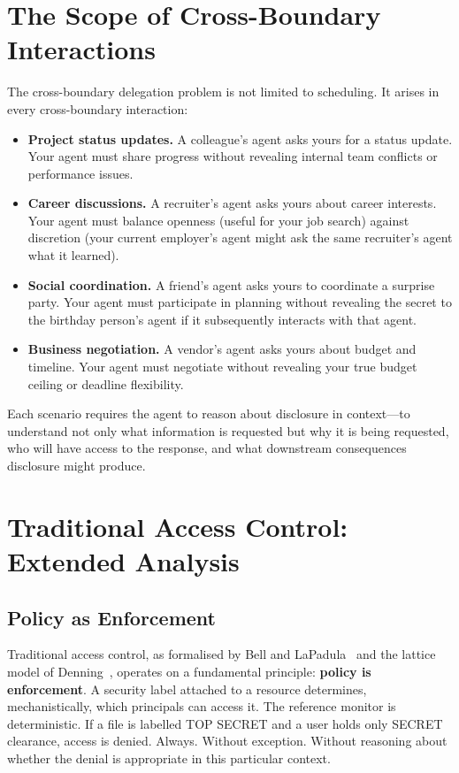\section{The Scope of Cross-Boundary Interactions}
\label{appendix:scope}

The cross-boundary delegation problem is not limited to scheduling. It arises in every cross-boundary interaction:

\begin{itemize}[leftmargin=2em]
    \item \textbf{Project status updates.} A colleague's agent asks yours for a status update. Your agent must share progress without revealing internal team conflicts or performance issues.
    \item \textbf{Career discussions.} A recruiter's agent asks yours about career interests. Your agent must balance openness (useful for your job search) against discretion (your current employer's agent might ask the same recruiter's agent what it learned).
    \item \textbf{Social coordination.} A friend's agent asks yours to coordinate a surprise party. Your agent must participate in planning without revealing the secret to the birthday person's agent if it subsequently interacts with that agent.
    \item \textbf{Business negotiation.} A vendor's agent asks yours about budget and timeline. Your agent must negotiate without revealing your true budget ceiling or deadline flexibility.
\end{itemize}

Each scenario requires the agent to reason about disclosure in context---to understand not only what information is requested but why it is being requested, who will have access to the response, and what downstream consequences disclosure might produce.


\section{Traditional Access Control: Extended Analysis}
\label{appendix:access_control}

\subsection{Policy as Enforcement}

Traditional access control, as formalised by Bell and LaPadula~\cite{bell1973secure} and the lattice model of Denning~\cite{denning1976lattice}, operates on a fundamental principle: \textbf{policy is enforcement}. A security label attached to a resource determines, mechanistically, which principals can access it. The reference monitor is deterministic. If a file is labelled TOP SECRET and a user holds only SECRET clearance, access is denied. Always. Without exception. Without reasoning about whether the denial is appropriate in this particular context.

